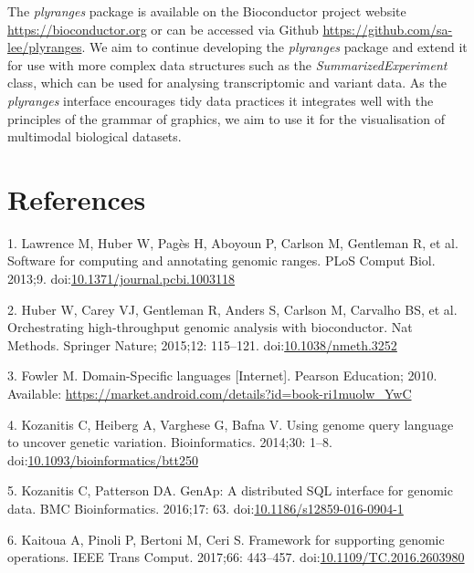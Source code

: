 \documentclass[10pt,letterpaper]{article}
\begin{document}
The \emph{plyranges} package is available on the Bioconductor project
website \url{https://bioconductor.org} or can be accessed via Github
\url{https://github.com/sa-lee/plyranges}. We aim to continue developing
the \emph{plyranges} package and extend it for use with more complex
data structures such as the \emph{SummarizedExperiment} class, which can
be used for analysing transcriptomic and variant data. As the
\emph{plyranges} interface encourages tidy data practices it integrates
well with the principles of the grammar of graphics, we aim to use it
for the visualisation of multimodal biological datasets.

\section*{References}\label{references}

\hypertarget{refs}{}
\hypertarget{ref-Lawrence2013-wg}{}
1. Lawrence M, Huber W, Pagès H, Aboyoun P, Carlson M, Gentleman R, et
al. Software for computing and annotating genomic ranges. PLoS Comput
Biol. 2013;9.
doi:\href{https://doi.org/10.1371/journal.pcbi.1003118}{10.1371/journal.pcbi.1003118}

\hypertarget{ref-Huber2015-ei}{}
2. Huber W, Carey VJ, Gentleman R, Anders S, Carlson M, Carvalho BS, et
al. Orchestrating high-throughput genomic analysis with bioconductor.
Nat Methods. Springer Nature; 2015;12: 115--121.
doi:\href{https://doi.org/10.1038/nmeth.3252}{10.1038/nmeth.3252}

\hypertarget{ref-Fowler2010-zd}{}
3. Fowler M. Domain-Specific languages {[}Internet{]}. Pearson
Education; 2010. Available:
\url{https://market.android.com/details?id=book-ri1muolw_YwC}

\hypertarget{ref-Kozanitis2014-va}{}
4. Kozanitis C, Heiberg A, Varghese G, Bafna V. Using genome query
language to uncover genetic variation. Bioinformatics. 2014;30: 1--8.
doi:\href{https://doi.org/10.1093/bioinformatics/btt250}{10.1093/bioinformatics/btt250}

\hypertarget{ref-Kozanitis2016-bm}{}
5. Kozanitis C, Patterson DA. GenAp: A distributed SQL interface for
genomic data. BMC Bioinformatics. 2016;17: 63.
doi:\href{https://doi.org/10.1186/s12859-016-0904-1}{10.1186/s12859-016-0904-1}

\hypertarget{ref-Kaitoua2017-pw}{}
6. Kaitoua A, Pinoli P, Bertoni M, Ceri S. Framework for supporting
genomic operations. IEEE Trans Comput. 2017;66: 443--457.
doi:\href{https://doi.org/10.1109/TC.2016.2603980}{10.1109/TC.2016.2603980}
\end{document}

